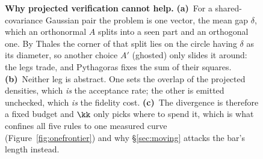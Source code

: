 \begin{figure}[t]
{}
\caption{\textbf{Why projected verification cannot help.}
\textbf{(a)}~For a shared-covariance Gaussian pair the problem is one vector, the mean gap $\delta$,
which an orthonormal $A$ splits into a seen part and an orthogonal one. By Thales the corner of that
split lies on the circle having $\delta$ as its diameter, so another choice $A'$ (ghosted) only
slides it around: the legs trade, and Pythagoras fixes the sum of their squares.
\textbf{(b)}~Neither leg is abstract. One sets the overlap of the projected densities, which
\emph{is} the acceptance rate; the other is emitted unchecked, which \emph{is} the fidelity cost.
\textbf{(c)}~The divergence is therefore a fixed budget and $\kk$ only picks where to spend it,
which is what confines all five rules to one measured curve (Figure~\ref{fig:onefrontier}) and why
\S\ref{sec:moving} attacks the bar's length instead.}
\label{fig:conservation}
\end{figure}
